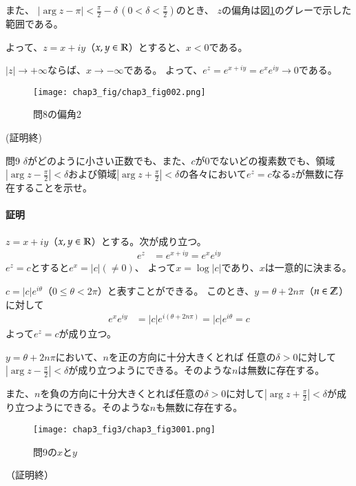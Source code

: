 また、
$|\arg z-\pi|<\frac{\pi}{2}-\delta\,(0<\delta<\frac{\pi}{2})$のとき、
$z$の偏角は図\ref{fig:chap3prob8-2}のグレーで示した範囲である。

よって、$z=x+iy$（$x,y\in\mathbb{R}$）とすると、$x<0$である。

$|z|\longrightarrow+\infty$ならば、$x\longrightarrow-\infty$である。
よって、$e^z=e^{x+iy}=e^xe^{iy}\longrightarrow0$である。
\begin{figure}[h]
    \centering
    \texttt{[image: chap3\_fig/chap3\_fig002.png]}
    \caption{問8の偏角2}
    \label{fig:chap3prob8-2}
\end{figure}
(証明終)

\begin{mysimplebox}{問9}
    $\delta$がどのように小さい正数でも、また、$c$が0でないどの複素数でも、領域$|\arg z-\frac{\pi}{2}|<\delta$および領域$|\arg z+\frac{\pi}{2}|<\delta$の各々において$e^z=c$なる$z$が無数に存在することを示せ。
\end{mysimplebox}
\paragraph{証明}
$z=x+iy$（$x,y\in\mathbb{R}$）とする。次が成り立つ。
\begin{align*}
    e^z&=e^{x+iy}=e^xe^{iy}
\end{align*}
$e^z=c$とすると$e^x=|c|(\neq0)$、
よって$x=\log|c|$であり、$x$は一意的に決まる。

$c=|c|e^{i\theta}$（$0\le\theta<2\pi$）と表すことができる。
このとき、$y=\theta+2n\pi$（$n\in\mathbb{Z}$）に対して
\begin{align*}
    e^xe^{iy}&=|c|e^{i(\theta+2n\pi)}=|c|e^{i\theta}=c
\end{align*}
よって$e^z=c$が成り立つ。

$y=\theta+2n\pi$において、$n$を正の方向に十分大きくとれば
任意の$\delta>0$に対して$|\arg z-\frac{\pi}{2}|<\delta$が成り立つようにできる。そのような$n$は無数に存在する。

また、$n$を負の方向に十分大きくとれば任意の$\delta>0$に対して$|\arg z+\frac{\pi}{2}|<\delta$が成り立つようにできる。そのような$n$も無数に存在する。
\begin{figure}[h]
    \centering
    \texttt{[image: chap3\_fig3/chap3\_fig3001.png]}
    \caption{問9の$x$と$y$}
    \label{fig:chap3prob9}
\end{figure}
（証明終）

